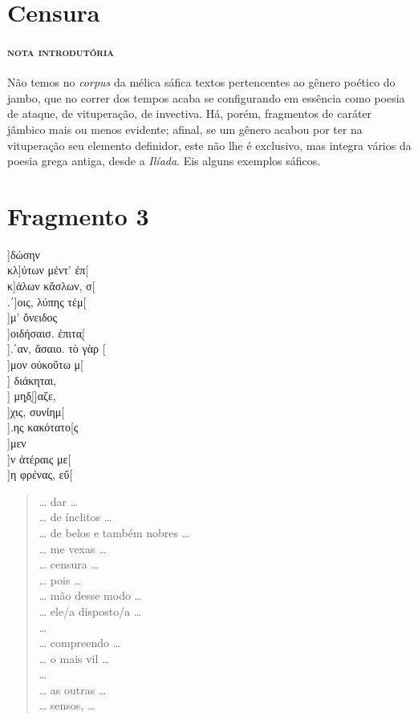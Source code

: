 {\section{Censura}

\paragraph{\textsc{nota introdutória}}
Não temos no \textit{corpus }da mélica sáfica textos pertencentes ao gênero
poético do jambo, que no correr dos tempos acaba se configurando em essência como poesia de
ataque, de vituperação, de invectiva. Há, porém,
fragmentos de caráter jâmbico mais ou menos evidente; afinal, se um gênero
acabou por ter na vituperação seu elemento definidor, este não lhe é exclusivo,
mas integra vários da poesia grega antiga, desde a \textit{Ilíada}. Eis
alguns exemplos sáficos.

\section{Fragmento 3} 

\begin{gkverse}
]δώσην\\
κλ]ύτων μέντ’ ἐπ[\\
κ]άλων κἄσλων, σ[\\
.΄]οις, λύπης τέμ[\\
 ]μ’ ὄνειδος\\
]οιδήσαισ. ἐπιτα̣[\\
].΄αν, ἄσαιο. τὸ γὰρ [\\
]μον οὐκοὔτω μ[\\
] διάκηται,\\
  ] μη̣δ̣[\qquad    ]αζε,\\
  ]χις, συνίημ[\\ 
].ης κακότατο[ς\\
  ]μεν\\
  ]ν ἀτέραις με[\\
]η φρένας, εὔ[
\end{gkverse}
\pagebreak
\begin{verse}
\ldots{} dar \ldots{}\\
\ldots{} de ínclitos \ldots{}\\
\ldots{} de belos e também nobres \ldots{}\\
\ldots{} me vexas \ldots{}\\
\ldots{} censura \ldots{}\\
\ldots{} pois \ldots{}\\
\ldots{} mão desse modo \ldots{}\\
\ldots{} ele/a disposto/a \ldots{}\\
\ldots{}\\
\ldots{} compreendo \ldots{}\\
\ldots{} o mais vil \ldots{}\\
\ldots{}\\
\ldots{} as outras \ldots{}\\
\ldots{} sensos, \ldots{}
\end{verse}

}
